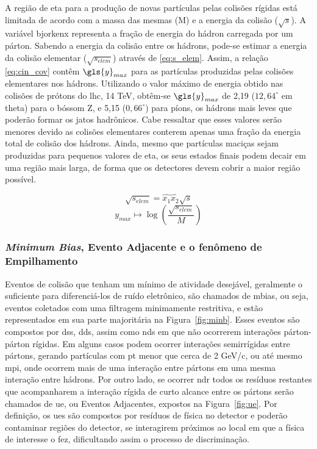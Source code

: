 A região de \gls{eta} para a produção de novas partículas pelas colisões
rígidas está limitada de acordo com a massa das mesmas
(M) e a energia da colisão ($\sqrt{s}$). A variável \gls{bjorkenx} representa a
fração de energia do hádron carregada por um párton. Sabendo a energia da colisão entre os
hádrons, pode-se estimar a energia da colisão elementar ($\sqrt{s_{elem}}$)
através de \ref{eq:s_elem}. Assim, a relação \ref{eq:cin_cov} contêm $\gls{y}_{max}$
para as partículas produzidas pelas colisões elementares nos hádrons.
Utilizando o valor máximo de energia obtido nas colisões de prótons do \gls{lhc}, 14 TeV, 
obtêm-se $\gls{y}_{max}$ de 2,19 ($12,64^{\circ}$ em \gls{theta}) para o bóssom Z, 
e 5,15 ($0,66^{\circ}$) para píons, os hádrons mais leves que poderão formar os
jatos hadrônicos. Cabe ressaltar que esses valores serão menores devido as
colisões elementares conterem apenas uma fração da energia total 
de colisão dos hádrons. Ainda, mesmo que partículas maciças sejam produzidas
para pequenos valores de \gls{eta}, os seus estados finais podem decair em uma
região mais larga, de forma que os detectores devem cobrir a maior região
possível.

\begin{equation}\label{eq:s_elem}
\sqrt{s_{elem}} = \hat{x_1} \hat{x_2} \sqrt{s}
\end{equation}
\begin{equation}\label{eq:cin_cov}
y_{max} \longmapsto \log\left( \frac{\sqrt{s_{elem}}}{M}\right)
\end{equation}



\subsubsection{\emph{Minimum Bias}, Evento Adjacente e o fenômeno de Empilhamento}
\label{sssec:minb_ue_pileup}

Eventos de colisão que tenham um mínimo de atividade desejável,
geralmente o suficiente para diferenciá-los de ruído eletrônico, 
são chamados de \gls{mbias}, ou
seja, eventos coletados com uma filtragem minimamente restritiva, e estão
representados em sua parte majoritária na Figura~\ref{fig:minb}. Esses
eventos são compostos por \glspl{ds}, \glspl{dd}, assim como \glspl{nd} em
que não ocorrerem interações párton-párton rígidas. Em alguns casos podem
ocorrer interações semirrígidas entre pártons, gerando partículas com \gls{pt}
menor que cerca de 2 GeV/c, ou até mesmo \gls{mpi}, onde ocorrem mais de uma
interação entre pártons em uma mesma interação entre hádrons. 
Por outro lado, se ocorrer \gls{ndr} 
todos os resíduos restantes que acompanharem a interação rígida de curto alcance
entre os pártons serão chamados de \gls{ue}, ou Eventos Adjacentes, expostos na
Figura~\ref{fig:ue}.
Por definição, os \glspl{ue} são compostos por resíduos de física no
detector e poderão contaminar regiões do detector, se interagirem próximos 
ao local em que a física de interesse o fez, dificultando assim o
processo de discriminação.


